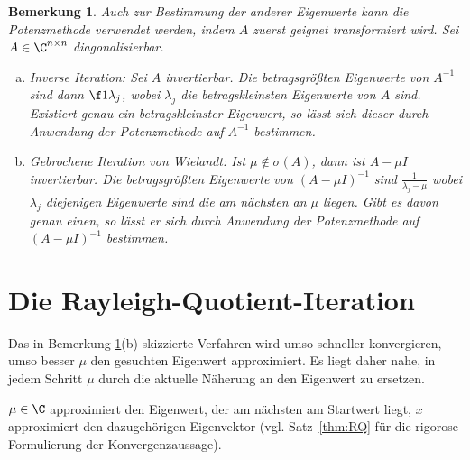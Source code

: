 \documentclass[
]{mycourse}
\theoremstyle{mythm}
\newtheorem{bemerkung}[theorem]{Bemerkung}
\theoremstyle{break}
\newcommand{\norm}[1]{\left\Vert#1\right\Vert}		%
\begin{document}
\begin{bemerkung}\label{bem:PM_andereEW}
Auch zur Bestimmung der anderer Eigenwerte kann die Potenzmethode verwendet werden, indem $A$ zuerst geignet transformiert wird.
Sei $A\in \C^{n\times n}$ diagonalisierbar.
\begin{enumerate}[(a)]
\item \emph{Inverse Iteration:} Sei $A$ invertierbar. Die betragsgrößten Eigenwerte von $A^{-1}$ sind dann  $\f 1{\lambda_j}$, wobei 
$\lambda_j$ die betragskleinsten Eigenwerte von $A$ sind. Existiert genau ein betragskleinster Eigenwert, so lässt sich dieser durch Anwendung der Potenzmethode auf $A^{-1}$ bestimmen. 
%
\item \emph{Gebrochene Iteration von Wielandt}: Ist $\mu\not\in \sigma(A)$, dann ist $A-\mu I$ invertierbar.
Die betragsgrößten Eigenwerte von $(A-\mu I)^{-1}$ sind $\frac{1}{\lambda_j-\mu}$ wobei $\lambda_j$ diejenigen Eigenwerte sind die
am nächsten an $\mu$ liegen. Gibt es davon genau einen, so lässt er sich durch Anwendung der Potenzmethode auf $(A-\mu I)^{-1}$ bestimmen.
\end{enumerate}
\end{bemerkung}

\section{Die Rayleigh-Quotient-Iteration}\label{sect:RQ}
Das in Bemerkung \ref{bem:PM_andereEW}(b) skizzierte Verfahren wird umso schneller konvergieren, umso besser $\mu$ den gesuchten Eigenwert 
approximiert. Es liegt daher nahe, in jedem Schritt $\mu$ durch die aktuelle Näherung an den Eigenwert zu ersetzen. 

\begin{alg}
\label{algo:RQ_Iteration}
\begin{algorithmic}
\Repeat
{}
\State{$x:=\tilde x / \norm{\tilde x}$}
\State \Return $\mu\in \C$ approximiert den Eigenwert, der am nächsten am Startwert liegt, $x$ approximiert den dazugehörigen
Eigenvektor (vgl. Satz~\ref{thm:RQ} für die rigorose Formulierung der Konvergenzaussage).
\end{algorithmic}
\end{alg}
\end{document}
